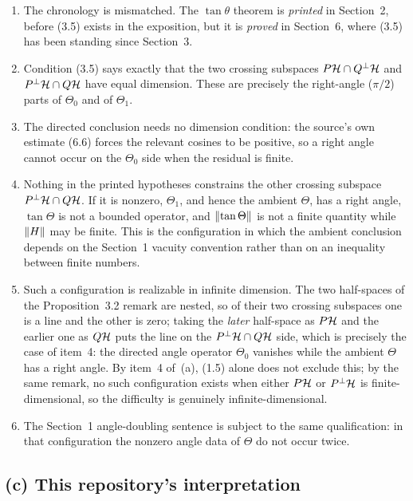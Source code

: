 \begin{enumerate}[leftmargin=2em]
\item The chronology is mismatched.  The $\tan\theta$ theorem is \emph{printed} in Section~2, before (3.5) exists in the exposition, but it is \emph{proved} in Section~6, where (3.5) has been standing since Section~3.
\item Condition (3.5) says exactly that the two crossing subspaces $P\mathcal{H}\cap Q^\perp\mathcal{H}$ and $P^\perp\mathcal{H}\cap Q\mathcal{H}$ have equal dimension.  These are precisely the right-angle ($\pi/2$) parts of $\Theta_0$ and of $\Theta_1$.
\item The directed conclusion needs no dimension condition: the source's own estimate (6.6) forces the relevant cosines to be positive, so a right angle cannot occur on the $\Theta_0$ side when the residual is finite.
\item Nothing in the printed hypotheses constrains the other crossing subspace $P^\perp\mathcal{H}\cap Q\mathcal{H}$.  If it is nonzero, $\Theta_1$, and hence the ambient $\Theta$, has a right angle, $\tan\Theta$ is not a bounded operator, and $\left\lVert \tan\Theta\right\rVert$ is not a finite quantity while $\left\lVert H\right\rVert$ may be finite.  This is the configuration in which the ambient conclusion depends on the Section~1 vacuity convention rather than on an inequality between finite numbers.
\item Such a configuration is realizable in infinite dimension.  The two half-spaces of the Proposition~3.2 remark are nested, so of their two crossing subspaces one is a line and the other is zero; taking the \emph{later} half-space as $P\mathcal{H}$ and the earlier one as $Q\mathcal{H}$ puts the line on the $P^\perp\mathcal{H}\cap Q\mathcal{H}$ side, which is precisely the case of item~4: the directed angle operator $\Theta_0$ vanishes while the ambient $\Theta$ has a right angle.  By item~4 of~(a), (1.5) alone does not exclude this; by the same remark, no such configuration exists when either $P\mathcal{H}$ or $P^\perp\mathcal{H}$ is finite-dimensional, so the difficulty is genuinely infinite-dimensional.
\item The Section~1 angle-doubling sentence is subject to the same qualification: in that configuration the nonzero angle data of $\Theta$ do not occur twice.
\end{enumerate}

\subsection*{(c) This repository's interpretation}

